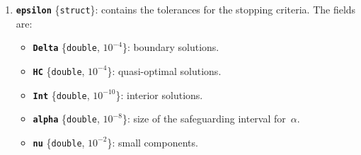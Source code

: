 \documentclass[acmtoms]{acmtrans2m}
\newcommand{\double}{{\tt double}}
\newcommand{\tenmt}{10^{\scriptscriptstyle -2}}
\newcommand{\tenmf}{10^{\scriptscriptstyle -4}}
\newcommand{\tenme}{10^{\scriptscriptstyle -8}}
\newcommand{\tenmte}{10^{\scriptscriptstyle -10}}
\begin{document}
\begin{enumerate}
\item{\tt\bf epsilon} \{{\tt struct}\}: contains the tolerances for the stopping criteria.
The fields are:
\begin{itemize}
\item {\tt\bf Delta} \{\double, $\tenmf$\}: boundary solutions.
\item {\tt\bf HC} \{\double, $\tenmf$\}: quasi-optimal solutions.
\item {\tt\bf Int} \{\double, $\tenmte$\}: interior solutions.
\item {\tt\bf alpha} \{\double, $\tenme$\}: size of the safeguarding interval for\ $\alpha$.
\item {\tt\bf nu} \{\double, $\tenmt$\}: small components.
\end{itemize}


\end{enumerate}
\end{document}
